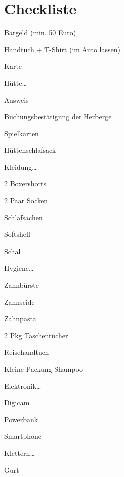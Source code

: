 \documentclass[a4paper]{scrartcl}
\begin{document}
\section*{Checkliste}
\begin{multicols}{3}
\begin{todolist}
    \item Bargeld (min. 50 Euro)
    \item Handtuch + T-Shirt (im Auto lassen)
    \item Karte
    \item Hütte\dots
    \begin{todolist}
        \item Ausweis
        \item Buchungsbestätigung der Herberge
        \item Spielkarten
        \item Hüttenschlafsack
    \end{todolist}
    \item Kleidung\dots
    \begin{todolist}
        \item 2 Boxershorts
        \item 2 Paar Socken
        \item Schlafsachen
        \item Softshell
        \item Schal
    \end{todolist}
    \item Hygiene\dots
    \begin{todolist}
        \item Zahnbürste
        \item Zahnseide
        \item Zahnpasta
        \item 2 Pkg Taschentücher
        \item Reisehandtuch
        \item Kleine Packung Shampoo
    \end{todolist}
    \item Elektronik\dots
    \begin{todolist}
        \item Digicam
        \item Powerbank
        \item Smartphone
    \end{todolist}
    \item Klettern\dots
    \begin{todolist}
        \item Gurt

\end{todolist}
\end{todolist}
\end{multicols}
\end{document}
